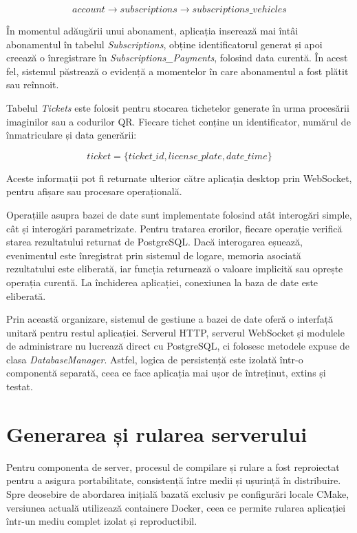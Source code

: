 \[
    account \rightarrow subscriptions \rightarrow subscriptions\_vehicles
\]

În momentul adăugării unui abonament, aplicația inserează mai întâi abonamentul în tabelul \textit{Subscriptions}, obține identificatorul generat și apoi creează o înregistrare în \textit{Subscriptions\_Payments}, folosind data curentă. În acest fel, sistemul păstrează o evidență a momentelor în care abonamentul a fost plătit sau reînnoit.

Tabelul \textit{Tickets} este folosit pentru stocarea tichetelor generate în urma procesării imaginilor sau a codurilor QR. Fiecare tichet conține un identificator, numărul de înmatriculare și data generării:

\[
    ticket = \{ticket\_id, license\_plate, date\_time\}
\]

Aceste informații pot fi returnate ulterior către aplicația desktop prin WebSocket, pentru afișare sau procesare operațională.

Operațiile asupra bazei de date sunt implementate folosind atât interogări simple, cât și interogări parametrizate. Pentru tratarea erorilor, fiecare operație verifică starea rezultatului returnat de PostgreSQL. Dacă interogarea eșuează, evenimentul este înregistrat prin sistemul de logare, memoria asociată rezultatului este eliberată, iar funcția returnează o valoare implicită sau oprește operația curentă. La închiderea aplicației, conexiunea la baza de date este eliberată.

Prin această organizare, sistemul de gestiune a bazei de date oferă o interfață unitară pentru restul aplicației. Serverul HTTP, serverul WebSocket și modulele de administrare nu lucrează direct cu PostgreSQL, ci folosesc metodele expuse de clasa \textit{DatabaseManager}. Astfel, logica de persistență este izolată într-o componentă separată, ceea ce face aplicația mai ușor de întreținut, extins și testat.

\section{Generarea și rularea serverului}

Pentru componenta de server, procesul de compilare și rulare a fost reproiectat pentru a asigura portabilitate, consistență între medii și ușurință în distribuire. Spre deosebire de abordarea inițială bazată exclusiv pe configurări locale CMake, versiunea actuală utilizează containere Docker, ceea ce permite rularea aplicației într-un mediu complet izolat și reproductibil.

